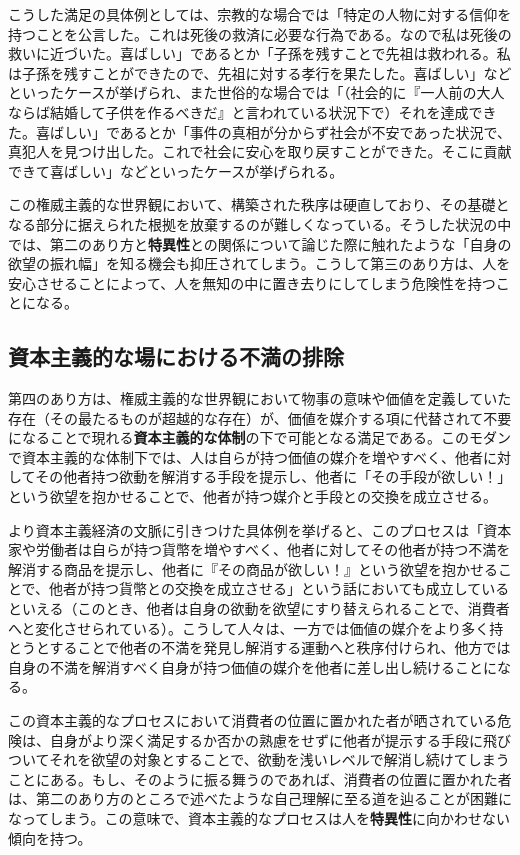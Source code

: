 こうした満足の具体例としては、宗教的な場合では「特定の人物に対する信仰を持つことを公言した。これは死後の救済に必要な行為である。なので私は死後の救いに近づいた。喜ばしい」であるとか「子孫を残すことで先祖は救われる。私は子孫を残すことができたので、先祖に対する孝行を果たした。喜ばしい」などといったケースが挙げられ、また世俗的な場合では「（社会的に『一人前の大人ならば結婚して子供を作るべきだ』と言われている状況下で）それを達成できた。喜ばしい」であるとか「事件の真相が分からず社会が不安であった状況で、真犯人を見つけ出した。これで社会に安心を取り戻すことができた。そこに貢献できて喜ばしい」などといったケースが挙げられる。

この権威主義的な世界観において、構築された秩序は硬直しており、その基礎となる部分に据えられた根拠を放棄するのが難しくなっている。そうした状況の中では、第二のあり方と\textbf{特異性}との関係について論じた際に触れたような「自身の欲望の振れ幅」を知る機会も抑圧されてしまう。こうして第三のあり方は、人を安心させることによって、人を無知の中に置き去りにしてしまう危険性を持つことになる。

\subsection{資本主義的な場における不満の排除}\label{ux8cc7ux672cux4e3bux7fa9ux7684ux306aux5834ux306bux304aux3051ux308bux4e0dux6e80ux306eux6392ux9664}

第四のあり方は、権威主義的な世界観において物事の意味や価値を定義していた存在（その最たるものが超越的な存在）が、価値を媒介する項に代替されて不要になることで現れる\textbf{資本主義的な体制}の下で可能となる満足である。このモダンで資本主義的な体制下では、人は自らが持つ価値の媒介を増やすべく、他者に対してその他者持つ欲動を解消する手段を提示し、他者に「その手段が欲しい！」という欲望を抱かせることで、他者が持つ媒介と手段との交換を成立させる。

より資本主義経済の文脈に引きつけた具体例を挙げると、このプロセスは「資本家や労働者は自らが持つ貨幣を増やすべく、他者に対してその他者が持つ不満を解消する商品を提示し、他者に『その商品が欲しい！』という欲望を抱かせることで、他者が持つ貨幣との交換を成立させる」という話においても成立しているといえる（このとき、他者は自身の欲動を欲望にすり替えられることで、消費者へと変化させられている）。こうして人々は、一方では価値の媒介をより多く持とうとすることで他者の不満を発見し解消する運動へと秩序付けられ、他方では自身の不満を解消すべく自身が持つ価値の媒介を他者に差し出し続けることになる。

この資本主義的なプロセスにおいて消費者の位置に置かれた者が晒されている危険は、自身がより深く満足するか否かの熟慮をせずに他者が提示する手段に飛びついてそれを欲望の対象とすることで、欲動を浅いレベルで解消し続けてしまうことにある。もし、そのように振る舞うのであれば、消費者の位置に置かれた者は、第二のあり方のところで述べたような自己理解に至る道を辿ることが困難になってしまう。この意味で、資本主義的なプロセスは人を\textbf{特異性}に向かわせない傾向を持つ。

